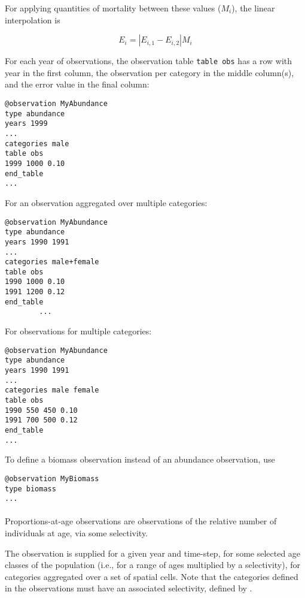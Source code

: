 For applying quantities of mortality between these values ($M_i$), the linear interpolation is

\begin{equation}
E_{i} = |E_{i,1} - E_{i,2}|  M_i
\end{equation}

For each year of observations, the observation table \texttt{table obs} has a row with year in the first column, the observation per category in the middle column(s), and the error value in the final column:

{\small{\begin{verbatim}
@observation MyAbundance
type abundance
years 1999
...
categories male
table obs
1999 1000 0.10
end_table
...
\end{verbatim}}}

For an observation aggregated over multiple categories:

{\small{\begin{verbatim}
@observation MyAbundance
type abundance
years 1990 1991
...
categories male+female
table obs
1990 1000 0.10
1991 1200 0.12
end_table
		...
\end{verbatim}}}

For observations for multiple categories:

{\small{\begin{verbatim}
@observation MyAbundance
type abundance
years 1990 1991
...
categories male female
table obs
1990 550 450 0.10
1991 700 500 0.12
end_table
...
\end{verbatim}}}

To define a biomass observation instead of an abundance observation, use

{\small{\begin{verbatim}
@observation MyBiomass
type biomass
...
\end{verbatim}}}


\paragraph*{}\label{sec:Observation-ProportionsAtAge}

Proportions-at-age observations are observations of the relative number of individuals at age, via some selectivity.

The observation is supplied for a given year and time-step, for some selected age classes of the population (i.e., for a range of ages multiplied by a selectivity), for categories aggregated over a set of spatial cells. Note that the categories defined in the observations must have an associated selectivity, defined by .

